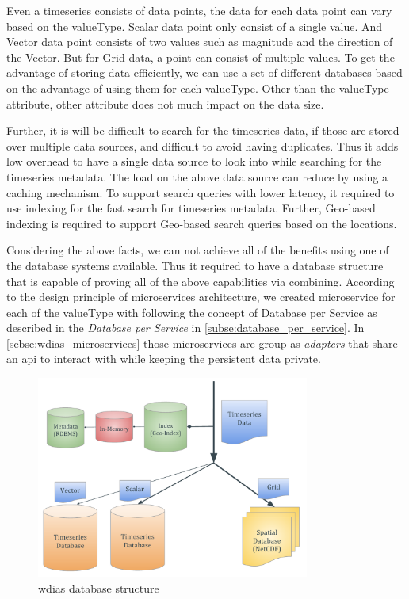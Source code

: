 Even a timeseries consists of data points, the data for each data point can vary based on the valueType. Scalar data point only consist of a single value. And Vector data point consists of two values such as magnitude and the direction of the Vector. But for Grid data, a point can consist of multiple values. To get the advantage of storing data efficiently, we can use a set of different databases based on the advantage of using them for each valueType. Other than the valueType attribute, other attribute does not much impact on the data size.

Further, it is will be difficult to search for the timeseries data, if those are stored over multiple data sources, and difficult to avoid having duplicates. Thus it adds low overhead to have a single data source to look into while searching for the timeseries metadata. The load on the above data source can reduce by using a caching mechanism. To support search queries with lower latency, it required to use indexing for the fast search for timeseries metadata. Further, Geo-based indexing is required to support Geo-based search queries based on the locations. 

Considering the above facts, we can not achieve all of the benefits using one of the database systems available. Thus it required to have a database structure that is capable of proving all of the above capabilities via combining. According to the design principle of microservices architecture, we created microservice for each of the valueType with following the concept of Database per Service as described in the \emph{Database per Service} in \cref{subse:database_per_service}. In \cref{sebse:wdias_microservices} those microservices are group as \emph{adapters} that share an \acrshort{api} to interact with while keeping the persistent data private.

\begin{figure}[htp]
    \centering
    \includegraphics[width=0.8\textwidth]{method/microservice/wdias_database_structure.pdf}
    \caption{\acrshort{wdias} database structure}
    \label{fi:database_structure}
\end{figure}

